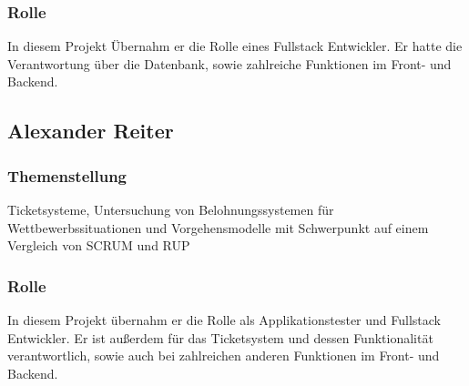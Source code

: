 \subsubsection{Rolle}
In diesem Projekt Übernahm er die Rolle eines Fullstack Entwickler. Er hatte die Verantwortung über die Datenbank, 
sowie zahlreiche Funktionen im Front- und Backend. 

\subsection{Alexander Reiter}
\subsubsection{Themenstellung}
Ticketsysteme, Untersuchung von Belohnungssystemen für Wettbewerbssituationen und Vorgehensmodelle mit Schwerpunkt auf einem Vergleich von SCRUM und RUP
\subsubsection{Rolle}
In diesem Projekt übernahm er die Rolle als Applikationstester und Fullstack Entwickler. Er ist außerdem für das Ticketsystem und dessen Funktionalität
verantwortlich, sowie auch bei zahlreichen anderen Funktionen im Front- und Backend.
\newpage